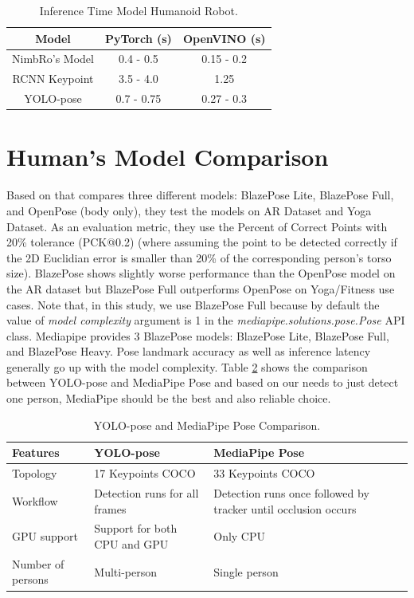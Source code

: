 \def\arraystretch{1.5}
\begin{longtable}{|c|c|c|}
  \caption{Inference Time Model Humanoid Robot.}
  \label{tb:inferencerobot}\\
  \hline
  \rowcolor[HTML]{C0C0C0}
  \textbf{Model}    & \textbf{PyTorch (s)} & \textbf{OpenVINO (s)}\\
  \hline
  NimbRo's Model & 0.4 - 0.5 & 0.15 - 0.2 \\
  \hline
  RCNN Keypoint  & 3.5 - 4.0 & 1.25 \\
  \hline
  YOLO-pose      & 0.7 - 0.75& 0.27 - 0.3 \\
  \hline
\end{longtable}


\section{Human's Model Comparison}
\label{sec:humanmodelcomparison}

Based on \parencite{bazarevsky2020} that compares three different models: BlazePose Lite, BlazePose Full, and OpenPose (body only), they test the models on AR Dataset and Yoga Dataset. As an evaluation metric, they use the Percent of Correct Points with 20\% tolerance (PCK@0.2)
(where assuming the point to be detected correctly if the 2D Euclidian error is smaller than 20\% of the corresponding person's torso size). BlazePose shows slightly worse performance than the OpenPose model on the AR dataset but BlazePose Full outperforms OpenPose on Yoga/Fitness use cases.
Note that, in this study, we use BlazePose Full because by default the value of \emph{model complexity} argument is 1 in the \emph{mediapipe.solutions.pose.Pose} API class. Mediapipe provides 3 BlazePose models: BlazePose Lite, BlazePose Full, and BlazePose Heavy. Pose landmark accuracy as well as inference latency generally go up with the model complexity.
Table \ref{tb:yoloandmediapipecomparison} shows the comparison between YOLO-pose and MediaPipe Pose and based on our needs to just detect one person, MediaPipe should be the best and also reliable choice.  

\def\arraystretch{1}
\begin{longtable}{|p{3cm}|p{5cm}|p{5cm}|}
  \caption{YOLO-pose and MediaPipe Pose Comparison.}
  \label{tb:yoloandmediapipecomparison}\\
  \hline
  \rowcolor[HTML]{C0C0C0}
  \textbf{Features}    & \textbf{YOLO-pose} & \textbf{MediaPipe Pose}\\
  \hline
  Topology             & 17 Keypoints COCO  & 33 Keypoints COCO \\
  \hline
  Workflow             & Detection runs for all frames & Detection runs once followed by tracker until occlusion occurs \\
  \hline
  GPU support          & Support for both CPU and GPU & Only CPU \\
  \hline
  Number of persons    & Multi-person & Single person \\
  \hline
\end{longtable}

